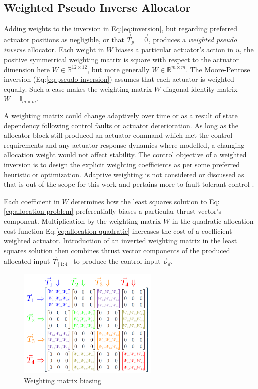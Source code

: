 \subsection{Weighted Pseudo Inverse Allocator}
\label{subsec:allocation.allocators.weightedinverse}
Adding weights to the inversion in Eq:\ref{eq:inversion}, but regarding preferred actuator positions as negligible, or that $\vec{T}_p=\vec{0}$, produces a \emph{weighted pseudo inverse} allocator. Each weight in $W$ biases a particular actuator's action in $u$, the positive symmetrical weighting matrix is square with respect to the actuator dimension here $W\in\mathbb{R}^{12\times 12}$, but more generally $W\in\mathbb{R}^{m\times m}$. The Moore-Penrose inversion (Eq:\ref{eq:pseudo-inversion}) assumes that each actuator is weighted equally. Such a case makes the weighting matrix $W$ diagonal identity matrix $W = \mathbb{I}_{m\times m}$. 
\par
A weighting matrix could change adaptively over time or as a result of state dependency following control faults or actuator deterioration. As long as the allocator block still produced an actuator command which met the control requirements and any actuator response dynamics where modelled, a changing allocation weight would not affect stability. The control objective of a weighted inversion is to design the explicit weighting coefficients as per some preferred heuristic or optimization. Adaptive weighting is not considered or discussed as that is out of the scope for this work and pertains more to fault tolerant control \cite{FTCallocation}.
\par
Each coefficient in $W$ determines how the least squares solution to Eq:\ref{eq:allocation-problem} preferentially biases a particular thrust vector's component. Multiplication by the weighting matrix $W$ in the quadratic allocation cost function Eq:\ref{eq:allocation-quadratic} increases the cost of a coefficient weighted actuator. Introduction of an inverted weighting matrix in the least squares solution then combines thrust vector components of the produced allocated input $\vec{T}_{[1:4]}$ to produce the control input $\vec{\nu}_d$. 
\begin{figure}[htbp]
\vspace{-6pt}
\centering
\includegraphics[width=0.6\textwidth]{figs/weighted-matrix}
\vspace{-6pt}
\caption{Weighting matrix biasing}
\label{fig:weighted-matrix-allocation}
\vspace{-6pt}
\end{figure}
